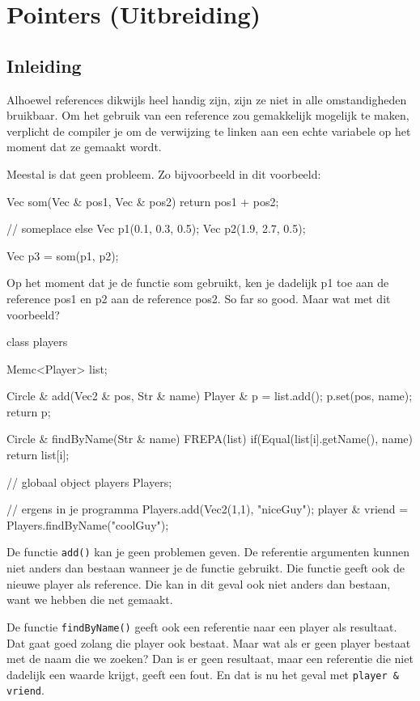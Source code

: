 \chapter{Pointers (Uitbreiding)}

\section{Inleiding}
Alhoewel references dikwijls heel handig zijn, zijn ze niet in alle omstandigheden bruikbaar. Om het gebruik van een reference zou gemakkelijk mogelijk te maken, verplicht de compiler je om de verwijzing te linken aan
een echte variabele op het moment dat ze gemaakt wordt.

Meestal is dat geen probleem. Zo bijvoorbeeld in dit voorbeeld:

\begin{code}
Vec som(Vec & pos1, Vec & pos2) {
  return pos1 + pos2;
}

// someplace else
Vec p1(0.1, 0.3, 0.5);
Vec p2(1.9, 2.7, 0.5);

Vec p3 = som(p1, p2); 
\end{code}

Op het moment dat je de functie som gebruikt, ken je dadelijk p1 toe aan de reference pos1 en p2 aan de reference pos2. So far so good. Maar wat met dit voorbeeld?

\begin{code}
class players {
  Memc<Player> list;
	
  Circle &  add(Vec2 & pos, Str & name) {
    Player & p = list.add();
    p.set(pos, name);
    return p;
  }	  

  Circle & findByName(Str & name) {
    FREPA(list) {
      if(Equal(list[i].getName(), name) {
        return list[i];
      }
    }
  }	
}
// globaal object
players Players;

// ergens in je programma 
Players.add(Vec2(1,1), "niceGuy");
player & vriend = Players.findByName("coolGuy");
\end{code}

De functie \texttt{add()} kan je geen problemen geven. De referentie argumenten kunnen niet anders dan bestaan wanneer je de functie gebruikt. Die functie geeft ook de nieuwe player als reference. Die kan in dit geval ook niet anders dan bestaan, want we hebben die net gemaakt.

De functie \texttt{findByName()} geeft ook een referentie naar een player als resultaat. Dat gaat goed zolang die player ook bestaat. Maar wat als er geen player bestaat met de naam die we zoeken? Dan is er geen resultaat, maar een referentie die niet dadelijk een waarde krijgt, geeft een fout. En dat is nu het geval met \texttt{player \& vriend}.

